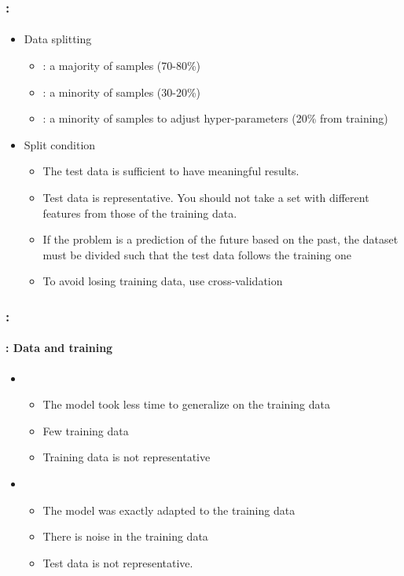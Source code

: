 \documentclass[xcolor=table]{beamer}
\begin{document}
\begin{frame}
	\frametitle{\insertshortsubtitle: \insertsection}
	\framesubtitle{\insertsubsection}
	
	\begin{itemize}
		\item Data splitting
		\begin{itemize}
			\item {}: a majority of samples (70-80\%)
			\item {}: a minority of samples (30-20\%)
			\item {}: a minority of samples to adjust hyper-parameters (20\% from training)
		\end{itemize}
		\item Split condition
		\begin{itemize}
			\item The test data is sufficient to have meaningful results.
			\item Test data is representative. You should not take a set with different features from those of the training data.
			\item If the problem is a prediction of the future based on the past, the dataset must be divided such that the test data follows the training one
			\item To avoid losing training data, use cross-validation
		\end{itemize}
	\end{itemize}
	
\end{frame}

\begin{frame}
	\frametitle{\insertshortsubtitle: \insertsection}
	\framesubtitle{\insertsubsection: Data and training}
	
	\begin{itemize}
		\item {}
		\begin{itemize}
			\item The model took less time to generalize on the training data
			\item Few training data
			\item Training data is not representative
		\end{itemize}

		\item {}
		\begin{itemize}
			\item The model was exactly adapted to the training data
			\item There is noise in the training data
			\item Test data is not representative.
		\end{itemize}

	\end{itemize}
	
\end{frame}
\end{document}
